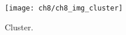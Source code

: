 \begin{figure}[!h]
	\centering
	\texttt{[image: ch8/ch8\_img\_cluster]}
	\caption[Cluster.] {Cluster.}
	\label{cluster}
\end{figure}



